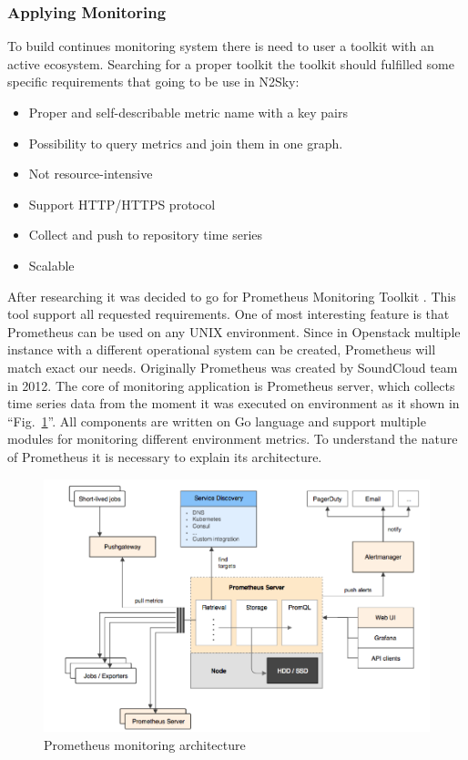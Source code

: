 \subsubsection{Applying Monitoring}\label{Applying Monitoring}
To build continues monitoring system there is need to user a toolkit with an active ecosystem.  Searching for a proper toolkit the toolkit should fulfilled some specific requirements that going to be use in N2Sky:
\begin{itemize}
\item Proper and self-describable metric name with a key pairs
\item Possibility to query metrics and join them in one graph.
\item Not resource-intensive
\item Support HTTP/HTTPS protocol
\item Collect and push to repository time series
\item Scalable
\end{itemize}

After researching it was decided to go for Prometheus Monitoring Toolkit \cite{alert_overview}. This tool support all requested requirements. One of most interesting feature is that Prometheus can be used on any UNIX environment. Since in Openstack multiple instance with a different operational system can be created, Prometheus will match exact our needs. 
Originally Prometheus was created by SoundCloud team in 2012. The core of monitoring application is Prometheus server, which collects time series data from the moment it was executed on environment as it shown in ``Fig.~\ref{fig:prometherus_arch}''. All components are written on Go language and support multiple modules for monitoring different environment metrics. 
To understand the nature of Prometheus it is necessary to explain its architecture. 

\begin{figure}[htbp]
\begin{center}
  \includegraphics[width=\linewidth]{components/3/prometherus_arch.png}
  \caption{Prometheus monitoring architecture}
  \label{fig:prometherus_arch}
\end{center}
\end{figure}

